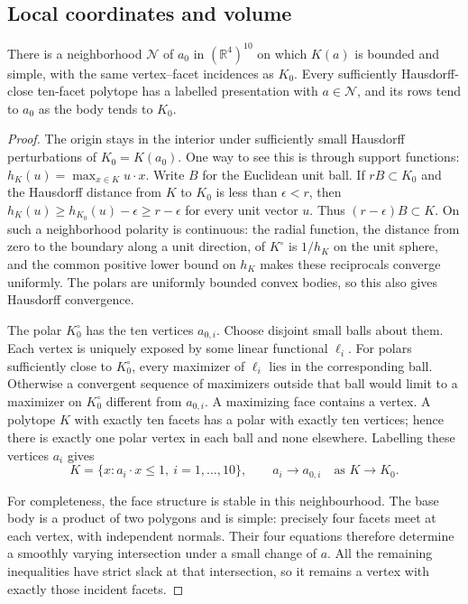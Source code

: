 \subsection{Local coordinates and volume}
\begin{lemma}\label{lem:hko-row-neighborhood}
There is a neighborhood $\mathcal N$ of $a_0$ in $(\mathbb R^4)^{10}$
on which $K(a)$ is bounded and simple, with the same vertex--facet
incidences as $K_0$. Every sufficiently Hausdorff-close ten-facet polytope
has a labelled presentation with $a\in\mathcal N$, and its rows tend to
$a_0$ as the body tends to $K_0$.
\end{lemma}
\begin{proof}
The origin stays in the interior under sufficiently small Hausdorff
perturbations of $K_0=K(a_0)$. One way to see this is through support
functions: $h_K(u)=\max_{x\in K}u\cdot x$. Write $B$ for the Euclidean
unit ball. If $rB\subset K_0$ and the Hausdorff distance from $K$ to $K_0$
is less than $\epsilon<r$, then
$h_K(u)\geq h_{K_0}(u)-\epsilon\geq r-\epsilon$ for every unit vector
$u$. Thus $(r-\epsilon)B\subset K$. On such a neighborhood polarity is
continuous: the radial function, the distance from zero to the boundary
along a unit direction, of $K^\circ$ is $1/h_K$ on the unit
sphere, and the common positive lower bound on $h_K$ makes these reciprocals
converge uniformly. The polars are uniformly bounded convex bodies, so this
also gives Hausdorff convergence.

The polar $K_0^\circ$ has the ten vertices $a_{0,i}$. Choose disjoint small
balls about them. Each vertex is uniquely exposed by some linear functional
$\ell_i$. For polars sufficiently close to $K_0^\circ$, every maximizer
of $\ell_i$ lies in the corresponding ball. Otherwise a convergent sequence
of maximizers outside that ball would limit to a maximizer on $K_0^\circ$
different from $a_{0,i}$. A maximizing face contains a vertex. A polytope
$K$ with exactly ten facets has a polar with exactly ten vertices; hence
there is exactly one polar vertex in each ball and none elsewhere. Labelling
these vertices $a_i$ gives
\[
 K=\{x:a_i\cdot x\leq1,\ i=1,\ldots,10\},\qquad a_i\longrightarrow a_{0,i}
 \quad\text{as }K\longrightarrow K_0.
\]

For completeness, the face structure is stable in this neighbourhood.
The base body is a product of two polygons and is simple: precisely four
facets meet at each vertex, with independent normals. Their four equations
therefore determine a smoothly varying intersection under a small change
of $a$. All the remaining inequalities have strict slack at that
intersection, so it remains a vertex with exactly those incident facets.


\end{proof}
